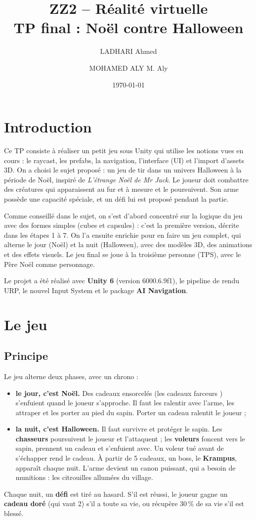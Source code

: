 \documentclass[11pt,a4paper]{article}
\title{ZZ2 -- Réalité virtuelle\\TP final : Noël contre Halloween}
\author{LADHARI Ahmed \and MOHAMED ALY M. Aly}
\date{\today}
\begin{document}
\maketitle
\tableofcontents
\newpage

\section{Introduction}

Ce TP consiste à réaliser un petit jeu sous Unity qui utilise les notions vues en cours : le raycast, les prefabs, la navigation, l'interface (UI) et l'import d'assets 3D. On a choisi le sujet proposé : un jeu de tir dans un univers Halloween à la période de Noël, inspiré de \emph{L'étrange Noël de Mr Jack}. Le joueur doit combattre des créatures qui apparaissent au fur et à mesure et le poursuivent. Son arme possède une capacité spéciale, et un défi lui est proposé pendant la partie.

Comme conseillé dans le sujet, on s'est d'abord concentré sur la logique du jeu avec des formes simples (cubes et capsules) : c'est la première version, décrite dans les étapes 1 à 7. On l'a ensuite enrichie pour en faire un jeu complet, qui alterne le jour (Noël) et la nuit (Halloween), avec des modèles 3D, des animations et des effets visuels. Le jeu final se joue à la troisième personne (TPS), avec le Père Noël comme personnage.

Le projet a été réalisé avec \textbf{Unity 6} (version 6000.6.9f1), le pipeline de rendu URP, le nouvel Input System et le package \textbf{AI Navigation}.

\section{Le jeu}

\subsection{Principe}
Le jeu alterne deux phases, avec un chrono :
\begin{itemize}
  \item \textbf{le jour, c'est Noël.} Des cadeaux ensorcelés (les \og cadeaux farceurs \fg{}) s'enfuient quand le joueur s'approche. Il faut les ralentir avec l'arme, les attraper et les porter au pied du sapin. Porter un cadeau ralentit le joueur ;
  \item \textbf{la nuit, c'est Halloween.} Il faut survivre et protéger le sapin. Les \textbf{chasseurs} poursuivent le joueur et l'attaquent ; les \textbf{voleurs} foncent vers le sapin, prennent un cadeau et s'enfuient avec. Un voleur tué avant de s'échapper rend le cadeau. À partir de 5 cadeaux, un boss, le \textbf{Krampus}, apparaît chaque nuit. L'arme devient un canon puissant, qui a besoin de munitions : les citrouilles allumées du village.
\end{itemize}
Chaque nuit, un \textbf{défi} est tiré au hasard. S'il est réussi, le joueur gagne un \textbf{cadeau doré} (qui vaut 2) s'il a toute sa vie, ou récupère 30\,\% de sa vie s'il est blessé.
\end{document}
